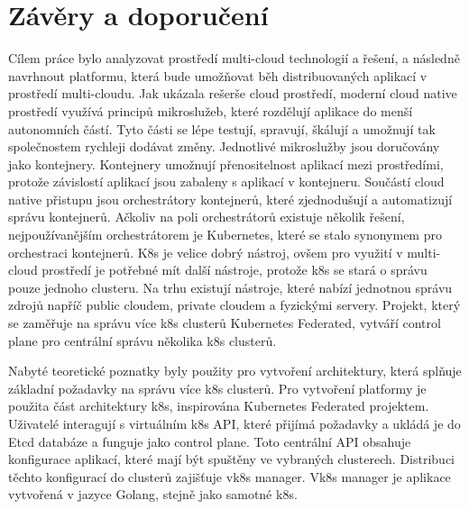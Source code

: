 \chapter{Závěry a doporučení}
Cílem práce bylo analyzovat prostředí multi-cloud technologií a řešení, a následně navrhnout platformu, která bude umožňovat běh distribuovaných aplikací v prostředí multi-cloudu. Jak ukázala rešerše cloud prostředí, moderní cloud native prostředí využívá principů mikroslužeb, které rozdělují aplikace do menší autonomních částí. Tyto části se lépe testují, spravují, škálují a umožnují tak společnostem rychleji dodávat změny. Jednotlivé mikroslužby jsou doručovány jako kontejnery. Kontejnery umožnují přenositelnost aplikací mezi prostředími, protože závislostí aplikací jsou zabaleny \linebreak s aplikací v kontejneru. Součástí cloud native přistupu jsou orchestrátory kontejnerů, které zjednodušují a automatizují správu kontejnerů. Ačkoliv na poli orchestrátorů existuje několik řešení, nejpoužívanějším orchestrátorem je Kubernetes, které se stalo synonymem pro orchestraci kontejnerů. K8s je velice dobrý nástroj, ovšem pro využití v multi-cloud prostředí je potřebné mít další nástroje, protože k8s se stará o správu pouze jednoho clusteru. Na trhu existují nástroje, které nabízí jednotnou správu zdrojů napříč public cloudem, private cloudem a fyzickými servery. Projekt, který se zaměřuje na správu více k8s clusterů Kubernetes Federated, vytváří control plane pro centrální správu několika k8s clusterů.\par
    Nabyté teoretické poznatky byly použity pro vytvoření architektury, která splňuje základní požadavky na správu více k8s clusterů. Pro vytvoření platformy je použita část architektury k8s, inspirována Kubernetes Federated projektem. Uživatelé \linebreak interagují s virtuálním k8s API, které přijímá požadavky a ukládá je do Etcd databáze a funguje jako control plane. Toto centrální API obsahuje konfigurace aplikací, které mají být spuštěny ve vybraných clusterech. Distribuci těchto konfigurací do clusterů zajišťuje vk8s manager. Vk8s manager je aplikace vytvořená v jazyce Golang, stejně jako samotné k8s. \par
